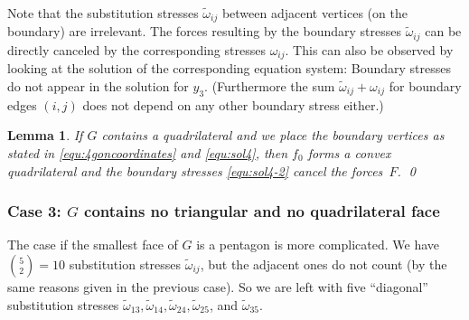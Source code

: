 \documentclass{article}
\theoremstyle{plain} \newtheorem{thm}{Theorem}[section]
\newtheorem{lem}{Lemma}[section]
\newcommand{\ot}{\tilde{\omega}}
\begin{document}
Note that the substitution stresses $\tilde \omega_{ij}$ between adjacent
vertices (on the boundary) are irrelevant. The 
forces resulting by the boundary stresses $\ot_{ij}$ 
can be directly canceled by the
corresponding stresses $ \omega_{ij}$. 
This can also be observed by looking at the solution  
of the corresponding equation system:
Boundary stresses do not appear in the solution for $y_3$. (Furthermore 
the sum $\ot_{ij}+\omega_{ij}$ for boundary edges $(i,j)$
does not depend on any other boundary stress either.)

\begin{lem}
If $G$ contains a quadrilateral and we place the boundary vertices as
stated in \eqref{equ:4goncoordinates} and \eqref{equ:sol4}, 
then $f_0$ forms a convex quadrilateral 
and the boundary stresses
 \eqref{equ:sol4-2}
 cancel the
forces~$F$.
\qed
\end{lem}


\noindent
\subsubsection*{Case 3: $G$ contains no triangular and no quadrilateral
  face}
The case if the smallest face of $G$ is a  pentagon is more complicated. 
We have $\binom52=10$ substitution stresses $\tilde \omega_{ij}$, but the adjacent ones
do not count (by the same reasons given in the previous case).
So we are left with five ``diagonal'' substitution stresses
$\ot_{13},\ot_{14},\ot_{24},\ot_{25}$, and $\ot_{35}$. 
\end{document}
